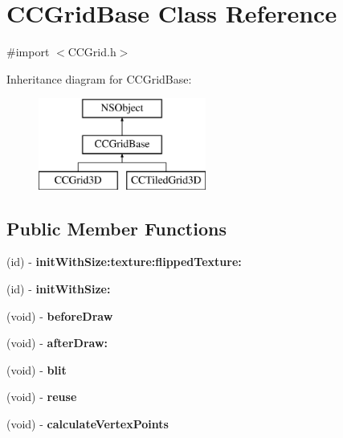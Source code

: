 \hypertarget{interface_c_c_grid_base}{\section{C\-C\-Grid\-Base Class Reference}
\label{interface_c_c_grid_base}
}


{\ttfamily \#import $<$C\-C\-Grid.\-h$>$}

Inheritance diagram for C\-C\-Grid\-Base\-:\begin{figure}[H]
\begin{center}
\leavevmode
\includegraphics[height=3.000000cm]{interface_c_c_grid_base}
\end{center}
\end{figure}
\subsection*{Public Member Functions}
\begin{DoxyCompactItemize}
\item 
\hypertarget{interface_c_c_grid_base_ac779d5bf3d474b17359463f4b992ddb4}{(id) -\/ {\bfseries init\-With\-Size\-:texture\-:flipped\-Texture\-:}}\label{interface_c_c_grid_base_ac779d5bf3d474b17359463f4b992ddb4}

\item 
\hypertarget{interface_c_c_grid_base_ac3490a29a9e8be77e1d9bf8a08ae698c}{(id) -\/ {\bfseries init\-With\-Size\-:}}\label{interface_c_c_grid_base_ac3490a29a9e8be77e1d9bf8a08ae698c}

\item 
\hypertarget{interface_c_c_grid_base_a35574f90b8d553a714759b961fe68949}{(void) -\/ {\bfseries before\-Draw}}\label{interface_c_c_grid_base_a35574f90b8d553a714759b961fe68949}

\item 
\hypertarget{interface_c_c_grid_base_a395b25189c5fcc454ab12b438ae1997f}{(void) -\/ {\bfseries after\-Draw\-:}}\label{interface_c_c_grid_base_a395b25189c5fcc454ab12b438ae1997f}

\item 
\hypertarget{interface_c_c_grid_base_a2238beb275031f4d761c5a283f174bd8}{(void) -\/ {\bfseries blit}}\label{interface_c_c_grid_base_a2238beb275031f4d761c5a283f174bd8}

\item 
\hypertarget{interface_c_c_grid_base_af2e2602914b109d9bb1f7b4261540aa3}{(void) -\/ {\bfseries reuse}}\label{interface_c_c_grid_base_af2e2602914b109d9bb1f7b4261540aa3}

\item 
\hypertarget{interface_c_c_grid_base_a2adeb1af62411bc6d8d2176ad4d405f0}{(void) -\/ {\bfseries calculate\-Vertex\-Points}}\label{interface_c_c_grid_base_a2adeb1af62411bc6d8d2176ad4d405f0}

\end{DoxyCompactItemize}
